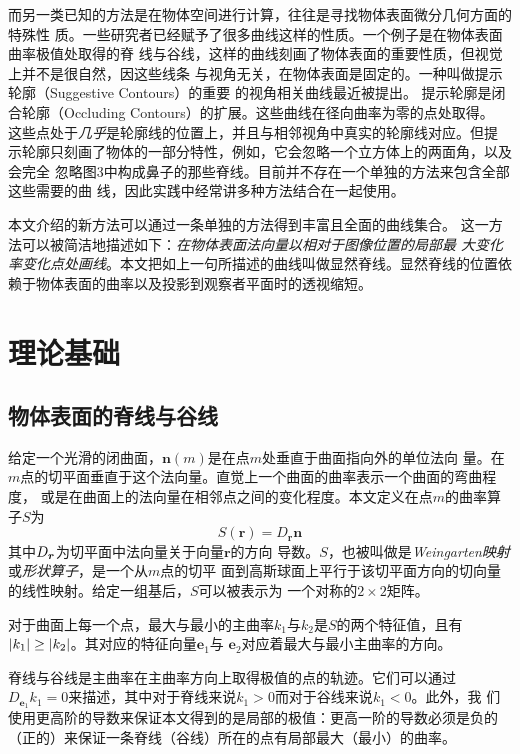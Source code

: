 \documentclass[10pt,a4paper]{article}
\theoremstyle{mythm}%
\numberwithin{equation}{section}
\DeclarePairedDelimiter\abs{\lvert}{\rvert}%
\begin{document}
\begin{CJK*}{UTF8}{wqyzh}
而另一类已知的方法是在物体空间进行计算，往往是寻找物体表面微分几何方面的特殊性
质。一些研究者已经赋予了很多曲线这样的性质\cite{Koenderink:1990:SS,
Ohtake:2004:RVL, Interrante:1995:ETSS}。一个例子是在物体表面曲率极值处取得的脊
线与谷线，这样的曲线刻画了物体表面的重要性质，但视觉上并不是很自然，因这些线条
与视角无关，在物体表面是固定的。一种叫做提示轮廓（Suggestive Contours）的重要
的视角相关曲线最近被\cite{DeCarlo:2003:SCCS,DeCarlo:2004:IRSC}提出。
提示轮廓是闭合轮廓（Occluding Contours）的扩展。这些曲线在径向曲率为零的点处取得。
这些点处于\emph{几乎}是轮廓线的位置上，并且与相邻视角中真实的轮廓线对应。但提
示轮廓只刻画了物体的一部分特性，例如，它会忽略一个立方体上的两面角，以及会完全
忽略图3中构成鼻子的那些脊线。目前并不存在一个单独的方法来包含全部这些需要的曲
线，因此实践中经常讲多种方法结合在一起使用。

本文介绍的新方法可以通过一条单独的方法得到丰富且全面的曲线集合。
这一方法可以被简洁地描述如下：\emph{在物体表面法向量以相对于图像位置的局部最
大变化率变化点处画线}。本文把如上一句所描述的曲线叫做显然脊线。显然脊线的位置依
赖于物体表面的曲率以及投影到观察者平面时的透视缩短。


\section{理论基础}

\subsection{物体表面的脊线与谷线}

给定一个光滑的闭曲面，$\bm{n}(m)$是在点$m$处垂直于曲面指向外的单位法向
量。在$m$点的切平面垂直于这个法向量。直觉上一个曲面的曲率表示一个曲面的弯曲程度，
或是在曲面上的法向量在相邻点之间的变化程度。本文定义在点$m$的曲率算子$S$为
\begin{equation}
    S(\bm{r})=D_{\bm{r}}\bm{n}
\end{equation}
其中$D_{\bm{r}}\bm$为切平面中法向量关于向量$\bm{r}$的方向
导数。$S$，也被叫做是\emph{Weingarten映射}或\emph{形状算子}，是一个从$m$点的切平
面到高斯球面上平行于该切平面方向的切向量的线性映射。给定一组基后，$S$可以被表示为
一个对称的$2\times2$矩阵。

对于曲面上每一个点，最大与最小的主曲率$k_1$与$k_2$是$S$的两个特征值，且有
$\abs{k_1}\geq\abs{k_2}$。其对应的特征向量$\bm{e}_1$与
$\bm{e}_2$对应着最大与最小主曲率的方向。

脊线与谷线是主曲率在主曲率方向上取得极值的点的轨迹。它们可以通过
$D_{\bm{e}_1}k_1=0$来描述，其中对于脊线来说$k_1>0$而对于谷线来说$k_1<0$。此外，我
们使用更高阶的导数来保证本文得到的是局部的极值：更高一阶的导数必须是负的
（正的）来保证一条脊线（谷线）所在的点有局部最大（最小）的曲率。


\end{CJK*}
\end{document}
